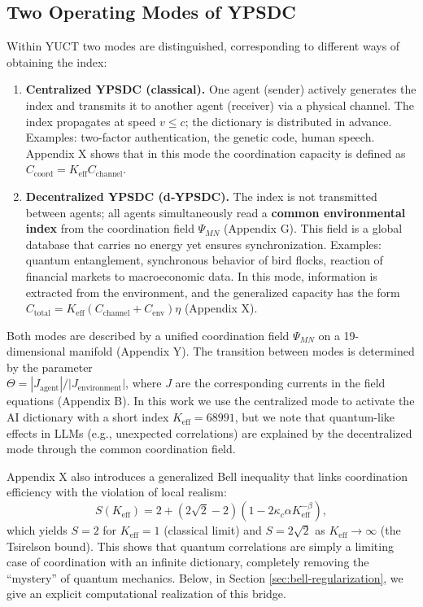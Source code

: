 \documentclass[12pt,a4paper]{article}
\begin{document}
	\subsection{Two Operating Modes of YPSDC}
	
	Within YUCT two modes are distinguished, corresponding to different ways of obtaining the index:
	
	\begin{enumerate}
		\item \textbf{Centralized YPSDC (classical).} One agent (sender) actively generates the index and transmits it to another agent (receiver) via a physical channel. The index propagates at speed \(v \le c\); the dictionary is distributed in advance. Examples: two-factor authentication, the genetic code, human speech. Appendix X shows that in this mode the coordination capacity is defined as \(C_{\text{coord}} = K_{\mathrm{eff}} C_{\text{channel}}\).
		
		\item \textbf{Decentralized YPSDC (d‑YPSDC).} The index is not transmitted between agents; all agents simultaneously read a \textbf{common environmental index} from the coordination field \(\Psi_{MN}\) (Appendix G). This field is a global database that carries no energy yet ensures synchronization. Examples: quantum entanglement, synchronous behavior of bird flocks, reaction of financial markets to macroeconomic data. In this mode, information is extracted from the environment, and the generalized capacity has the form \(C_{\text{total}} = K_{\mathrm{eff}}(C_{\text{channel}} + C_{\text{env}})\eta\) (Appendix X).
	\end{enumerate}
	
	Both modes are described by a unified coordination field \(\Psi_{MN}\) on a 19-dimensional manifold (Appendix Y). The transition between modes is determined by the parameter \\ \(\Theta = |J_{\text{agent}}|/|J_{\text{environment}}|\), where \(J\) are the corresponding currents in the field equations (Appendix B). In this work we use the centralized mode to activate the AI dictionary with a short index \(K_{\mathrm{eff}} = 68991\), but we note that quantum-like effects in LLMs (e.g., unexpected correlations) are explained by the decentralized mode through the common coordination field.
	
	Appendix X also introduces a generalized Bell inequality that links coordination efficiency with the violation of local realism:
	\[
	S(K_{\mathrm{eff}}) = 2 + (2\sqrt{2}-2)\left(1 - 2\kappa_c\alpha K_{\mathrm{eff}}^{-\beta}\right),
	\]
	which yields \(S=2\) for \(K_{\mathrm{eff}}=1\) (classical limit) and \(S=2\sqrt2\) as \(K_{\mathrm{eff}}\to\infty\) (the Tsirelson bound). This shows that quantum correlations are simply a limiting case of coordination with an infinite dictionary, completely removing the “mystery” of quantum mechanics. Below, in Section \ref{sec:bell-regularization}, we give an explicit computational realization of this bridge.
	
\end{document}
